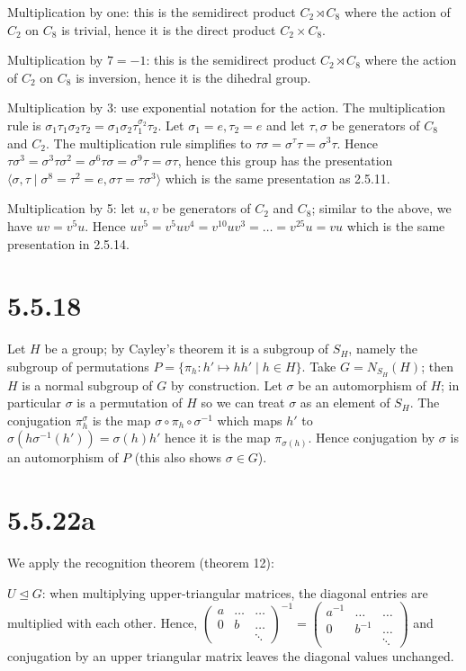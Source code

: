 \documentclass{article}
\def\<{\langle}
\def\>{\rangle}
\def\inv{{-1}}
\begin{document}
Multiplication by one: this is the semidirect product $C_2 \rtimes C_8$ where the action of $C_2$ on $C_8$ is trivial, hence it is the direct product $C_2 \times C_8$.

Multiplication by $7 = -1$: this is the semidirect product $C_2 \rtimes C_8$ where the action of $C_2$ on $C_8$ is inversion, hence it is the dihedral group.

Multiplication by $3$: use exponential notation for the action. The multiplication rule is $\sigma_1 \tau_1 \sigma_2 \tau_2 = \sigma_1 \sigma_2 \tau_1^{\sigma_2} \tau_2$. Let $\sigma_1 = e, \tau_2 = e$ and let $\tau, \sigma$ be generators of $C_8$ and $C_2$. The multiplication rule simplifies to $\tau \sigma = \sigma^\tau \tau = \sigma^3 \tau$. Hence $\tau \sigma^3 = \sigma^3 \tau \sigma^2 = \sigma^6 \tau \sigma = \sigma^9 \tau = \sigma \tau$, hence this group has the presentation $\< \sigma, \tau \mid \sigma^8 = \tau^2 = e, \sigma \tau = \tau \sigma^3 \>$ which is the same presentation as 2.5.11.

Multiplication by 5: let $u, v$ be generators of $C_2$ and $C_8$; similar to the above, we have $u v = v^5 u$. Hence $u v^5 = v^5 u v^4 = v^{10} u v^3 = \ldots = v^{25} u = vu$ which is the same presentation in 2.5.14.

\section*{5.5.18}

Let $H$ be a group; by Cayley's theorem it is a subgroup of $S_H$, namely the subgroup of permutations $P = \{ \pi_h: h' \mapsto hh' \mid h \in H\}$. Take $G = N_{S_H}(H)$; then $H$ is a normal subgroup of $G$ by construction. Let $\sigma$ be an automorphism of $H$; in particular $\sigma$ is a permutation of $H$ so we can treat $\sigma$ as an element of $S_H$. The conjugation $\pi_h^\sigma$ is the map $\sigma \circ \pi_h \circ \sigma^\inv$ which maps $h'$ to $\sigma(h\sigma^\inv(h')) = \sigma(h) h'$ hence it is the map $\pi_{\sigma(h)}$. Hence conjugation by $\sigma$ is an automorphism of $P$ (this also shows $\sigma \in G$).

\section*{5.5.22a}

We apply the recognition theorem (theorem 12):

$U \trianglelefteq G$: when multiplying upper-triangular matrices, the diagonal entries are multiplied with each other. Hence, $\begin{pmatrix} a & \ldots & \ldots \\ 0 & b & \ldots \\ & & \ddots \end{pmatrix}^\inv = \begin{pmatrix} a^\inv & \ldots & \ldots \\ 0 & b^\inv & \ldots \\ & & \ddots \end{pmatrix}$ and conjugation by an upper triangular matrix leaves the diagonal values unchanged.
\end{document}
